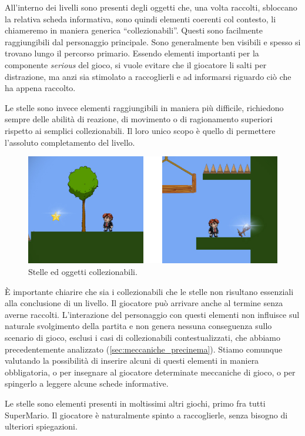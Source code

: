 All’interno dei livelli sono presenti degli oggetti che, una volta raccolti, sbloccano la relativa scheda informativa, sono quindi elementi coerenti col contesto, li chiameremo in maniera generica “collezionabili”. Questi sono facilmente raggiungibili dal personaggio principale. Sono generalmente ben visibili e spesso si trovano lungo il percorso primario. Essendo elementi importanti per la componente \textit{serious} del gioco, si vuole evitare che il giocatore li salti per distrazione, ma anzi sia stimolato a raccoglierli e ad informarsi riguardo ciò che ha appena raccolto.

Le stelle sono invece elementi raggiungibili in maniera più difficile, richiedono sempre delle abilità di reazione, di movimento o di ragionamento superiori rispetto ai semplici collezionabili. Il loro unico scopo è quello di permettere l’assoluto completamento del livello.

\begin{figure}%
	\centering
	\includegraphics[width= 0.9\columnwidth]{images/gameDesign/25_stelle_collezionabili.jpg}
	\caption{Stelle ed oggetti collezionabili.}
	\label{fig:rigiocabilita_stelle_collezionabili}
\end{figure} 

È importante chiarire che sia i collezionabili che le stelle non risultano essenziali alla conclusione di un livello. Il giocatore può arrivare anche al termine senza averne raccolti. L’interazione del personaggio con questi elementi non influisce sul naturale svolgimento della partita e non genera nessuna conseguenza sullo scenario di gioco, esclusi i casi di collezionabili contestualizzati, che abbiamo precedentemente analizzato (\ref{sec:meccaniche_precinema}). Stiamo comunque valutando la possibilità di inserire alcuni di questi elementi in maniera obbligatoria, o per insegnare al giocatore determinate meccaniche di gioco, o per spingerlo a leggere alcune schede informative.

Le stelle sono elementi presenti in moltissimi altri giochi, primo fra tutti SuperMario. Il giocatore è naturalmente spinto a raccoglierle, senza bisogno di ulteriori spiegazioni.


